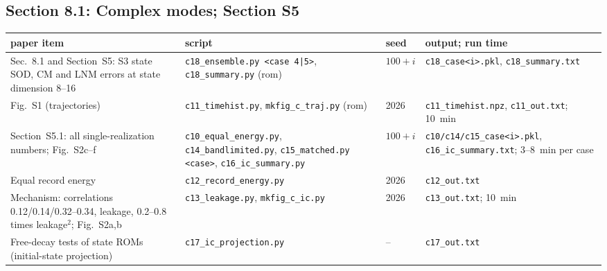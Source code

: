 \documentclass[10pt]{article}
\newcommand{\f}[1]{\texttt{#1}}
\begin{document}
\subsection*{Section 8.1: Complex modes; Section S5}
\begin{longtable}{L{0.31\textwidth}L{0.25\textwidth}L{0.08\textwidth}L{0.25\textwidth}}
\toprule
paper item & script & seed & output; run time\\ \midrule
Sec.~8.1 and Section~S5: S3 state SOD, CM and LNM errors at state dimension 8--16 & \f{c18\_\allowbreak{}ensemble.py <case 4|5>}, \f{c18\_\allowbreak{}summary.py} (rom) & $100+i$ & \f{c18\_\allowbreak{}case<i>.pkl}, \f{c18\_\allowbreak{}summary.txt}\\
Fig.~S1 (trajectories) & \f{c11\_\allowbreak{}timehist.py}, \f{mkfig\_\allowbreak{}c\_\allowbreak{}traj.py} (rom) & 2026 & \f{c11\_\allowbreak{}timehist.npz}, \f{c11\_\allowbreak{}out.txt}; 10~min\\
Section~S5.1: all single-realization numbers; Fig.~S2c--f & \f{c10\_\allowbreak{}equal\_\allowbreak{}energy.py}, \f{c14\_\allowbreak{}bandlimited.py}, \f{c15\_\allowbreak{}matched.py} \f{<case>}, \f{c16\_\allowbreak{}ic\_\allowbreak{}summary.py} & $100+i$ & \f{c10/\allowbreak{}c14/\allowbreak{}c15\_\allowbreak{}case<i>.pkl}, \f{c16\_\allowbreak{}ic\_\allowbreak{}summary.txt}; 3--8~min per case\\
Equal record energy & \f{c12\_\allowbreak{}record\_\allowbreak{}energy.py} & 2026 & \f{c12\_\allowbreak{}out.txt}\\
Mechanism: correlations 0.12/0.14/0.32--0.34, leakage, 0.2--0.8 times leakage$^2$; Fig.~S2a,b & \f{c13\_\allowbreak{}leakage.py}, \f{mkfig\_\allowbreak{}c\_\allowbreak{}ic.py} & 2026 & \f{c13\_\allowbreak{}out.txt}; 10~min\\
Free-decay tests of state ROMs (initial-state projection) & \f{c17\_\allowbreak{}ic\_\allowbreak{}projection.py} & -- & \f{c17\_\allowbreak{}out.txt}\\
\bottomrule
\end{longtable}
\end{document}
